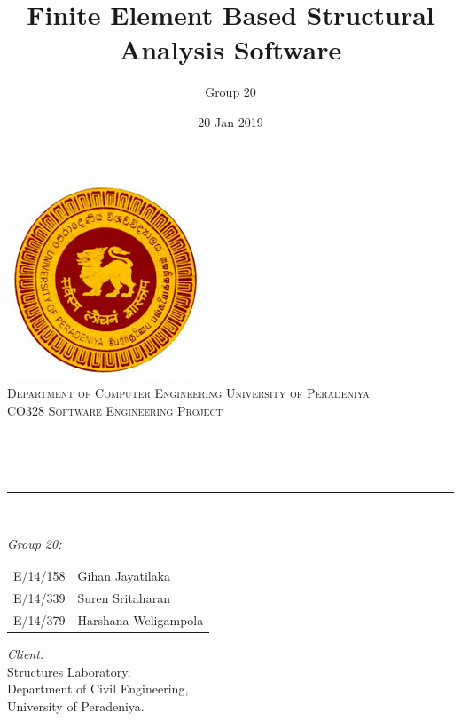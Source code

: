 \documentclass[12pt]{article}
\title{Finite Element Based Structural Analysis Software}								%
\author{Group 20}								%
\date{20 Jan 2019}											%
\makeatletter
\let\thetitle\@title
\makeatother
\begin{document}

\begin{titlepage}
	\centering
    \includegraphics[scale = 0.75]{logo.jpg}\\[1.0 cm]	%
    \textsc{\LARGE Department of Computer Engineering \newline\newline University of Peradeniya}\\[1.0 cm]	%
	\textsc{\Large CO328 Software Engineering Project}\\[0.5 cm]				%
	\rule{\linewidth}{0.2 mm} \\[0.4 cm]
	{ \huge \bfseries \thetitle}\\
	\rule{\linewidth}{0.2 mm} \\[0.5 cm]
	
	\begin{minipage}{0.8\textwidth}
		\large \emph{Group 20:}\\
			\begin{tabular}{l l}
			     E/14/158&Gihan Jayatilaka\\
			     E/14/339&Suren Sritaharan\\
			     E/14/379&Harshana Weligampola\\
			\end{tabular}
			\vspace{1cm}
			
		\large \emph{Client:}\\
		     Structures Laboratory,\\ Department of Civil Engineering,\\ University of Peradeniya.\\
	
			\end{minipage}~
			\begin{minipage}{0.8\textwidth}
            

        
	\end{minipage}\\
	
	
    
    
    
    
	
\end{titlepage}
\end{document}

